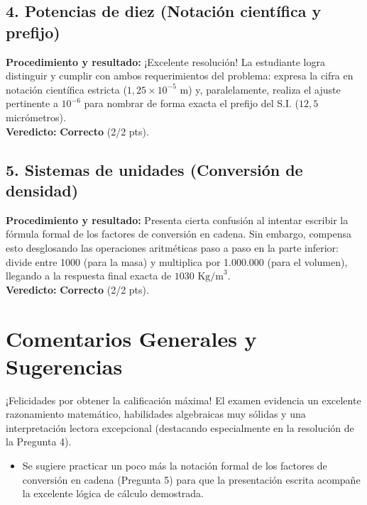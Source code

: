 \documentclass[12pt]{article}
\begin{document}
\subsection*{4. Potencias de diez (Notación científica y prefijo)}
\textbf{Procedimiento y resultado:} ¡Excelente resolución! La estudiante logra distinguir y cumplir con ambos requerimientos del problema: expresa la cifra en notación científica estricta ($1,25 \times 10^{-5}$ m) y, paralelamente, realiza el ajuste pertinente a $10^{-6}$ para nombrar de forma exacta el prefijo del S.I. ($12,5$ micrómetros). \\
\textbf{Veredicto:} \textbf{Correcto} (2/2 pts).

\subsection*{5. Sistemas de unidades (Conversión de densidad)}
\textbf{Procedimiento y resultado:} Presenta cierta confusión al intentar escribir la fórmula formal de los factores de conversión en cadena. Sin embargo, compensa esto desglosando las operaciones aritméticas paso a paso en la parte inferior: divide entre 1000 (para la masa) y multiplica por 1.000.000 (para el volumen), llegando a la respuesta final exacta de $1030 \text{ Kg/m}^3$. \\
\textbf{Veredicto:} \textbf{Correcto} (2/2 pts).

\vspace{0.5cm}
\section*{Comentarios Generales y Sugerencias}
¡Felicidades por obtener la calificación máxima! El examen evidencia un excelente razonamiento matemático, habilidades algebraicas muy sólidas y una interpretación lectora excepcional (destacando especialmente en la resolución de la Pregunta 4). 
\begin{itemize}
    \item Se sugiere practicar un poco más la notación formal de los factores de conversión en cadena (Pregunta 5) para que la presentación escrita acompañe la excelente lógica de cálculo demostrada.
\end{itemize}
\end{document}
